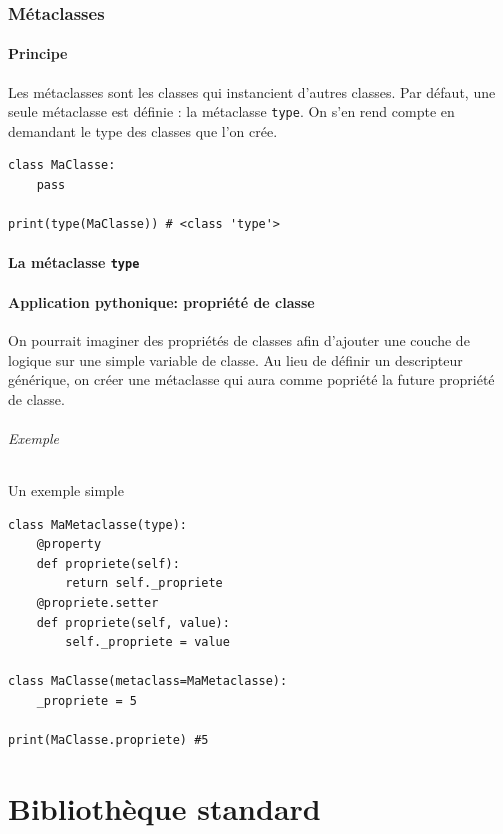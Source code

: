 \documentclass[a4paper, 10pt]{article}
\begin{document}
\section{Métaclasses}
\subsection{Principe}
\label{sec:metaclasses}
Les métaclasses sont les classes qui instancient d'autres classes. Par défaut, une seule métaclasse est définie : la métaclasse \texttt{type}. On s'en rend compte en demandant le type des classes que l'on crée.

\begin{verbatim}
class MaClasse:
    pass

print(type(MaClasse)) # <class 'type'>
\end{verbatim}

\subsection{La métaclasse \texttt{type}}



\subsection{Application pythonique: propriété de classe}
On pourrait imaginer des propriétés de classes afin d'ajouter une couche de logique sur une simple variable de classe. Au lieu de définir un descripteur générique, on créer une métaclasse qui aura comme popriété la future propriété de classe.

\paragraph{Exemple} Un exemple simple
\begin{verbatim}
class MaMetaclasse(type):
    @property
    def propriete(self):
        return self._propriete
    @propriete.setter
    def propriete(self, value):
        self._propriete = value

class MaClasse(metaclass=MaMetaclasse):
    _propriete = 5

print(MaClasse.propriete) #5
\end{verbatim}

\newpage

\part{Bibliothèque standard}
\end{document}
